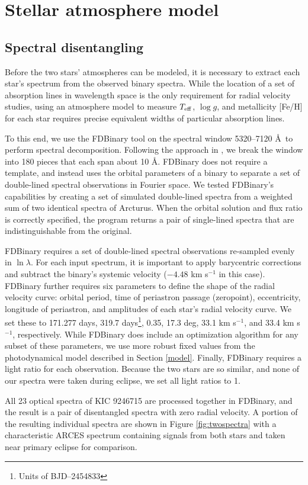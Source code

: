\section{Stellar atmosphere model}\label{atm}

\subsection{Spectral disentangling}\label{disentangle}
Before the two stars' atmospheres can be modeled, it is necessary to extract each star's spectrum from the observed binary spectra. While the location of a set of absorption lines in wavelength space is the only requirement for radial velocity studies, using an atmosphere model to measure $T_{\rm{eff}}$, $\log g$, and metallicity [Fe/H] for each star requires precise equivalent widths of particular absorption lines.

To this end, we use the FDBinary tool \citep{ili04} on the spectral window 5320--7120 \AA \ to perform spectral decomposition. Following the approach in \citet{bec14}, we break the window into 180 pieces that each span about 10 \AA. FDBinary does not require a template, and instead uses the orbital parameters of a binary to separate a set of double-lined spectral observations in Fourier space. We tested FDBinary's capabilities by creating a set of simulated double-lined spectra from a weighted sum of two identical spectra of Arcturus. When the orbital solution and flux ratio is correctly specified, the program returns a pair of single-lined spectra that are indistinguishable from the original.

FDBinary requires a set of double-lined spectral observations re-sampled evenly in $\ln \lambda$. For each input spectrum, it is important to apply barycentric corrections and subtract the binary's systemic velocity ($-4.48$ km s$^{-1}$ in this case). FDBinary further requires six parameters to define the shape of the radial velocity curve: orbital period, time of periastron passage (zeropoint), eccentricity, longitude of periastron, and amplitudes of each star's radial velocity curve. We set these to 171.277 days, 319.7 days\footnote{Units of BJD--2454833}, 0.35, 17.3 deg, 33.1 km s$^{-1}$, and 33.4 km s$^{-1}$, respectively. While FDBinary does include an optimization algorithm for any subset of these parameters, we use more robust fixed values from the photodynamical model described in Section \ref{model}. Finally, FDBinary requires a light ratio for each observation. Because the two stars are so similar, and none of our spectra were taken during eclipse, we set all light ratios to 1.

All 23 optical spectra of KIC 9246715 are processed together in FDBinary, and the result is a pair of disentangled spectra with zero radial velocity. A portion of the resulting individual spectra are shown in Figure \ref{fig:twospectra} with a characteristic ARCES spectrum containing signals from both stars and taken near primary eclipse for comparison.

    
    
    
  